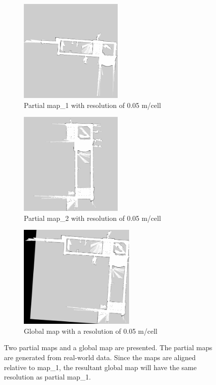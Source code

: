 \begin{figure}[H]
\begin{subfigure}{0.5\textwidth}
\includegraphics[width=0.9\linewidth, height=5cm]{figs/real_world_results/b/partial_map_1.jpg} 
\caption{Partial map\_1 with resolution of 0.05 m/cell}
\label{fig:real11}
\end{subfigure}
\begin{subfigure}{0.5\textwidth}
\includegraphics[width=0.9\linewidth, height=5cm]{figs/real_world_results/b/partial_map_2.jpg} 
\caption{Partial map\_2 with resolution of 0.05 m/cell}
\label{fig:real12}
\end{subfigure}
\begin{subfigure}{0.5\textwidth}
\centering
\includegraphics[width=0.9\linewidth, height=5cm]{figs/real_world_results/b/final_map.jpg} 
\caption{Global map with a resolution of 0.05 m/cell}
\label{fig:real13}
\end{subfigure}
\caption{Two partial maps and a global map are presented. The partial maps are generated from real-world data. Since the maps are aligned relative to map\_1, the resultant global map will have the same resolution as partial map\_1.}
\label{fig:real1}
\end{figure}

